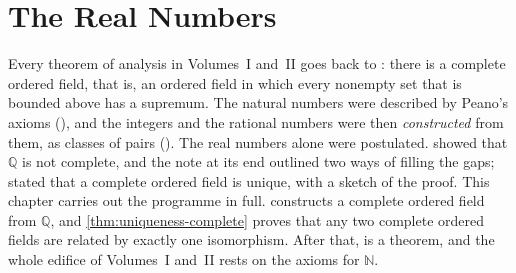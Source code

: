 \chapter{The Real Numbers}
\label{ch:real-numbers-construction}


Every theorem of analysis in Volumes~I and~II goes back to : there is a complete ordered field, that is, an ordered field in which every nonempty set that is bounded above has a supremum. The natural numbers were described by Peano's axioms (), and the integers and the rational numbers were then \emph{constructed} from them, as classes of pairs (). The real numbers alone were postulated.  showed that $\mathbb Q$ is not complete, and the note at its end outlined two ways of filling the gaps;  stated that a complete ordered field is unique, with a sketch of the proof. This chapter carries out the programme in full.  constructs a complete ordered field from $\mathbb Q$, and \cref{thm:uniqueness-complete} proves that any two complete ordered fields are related by exactly one isomorphism. After that,  is a theorem, and the whole edifice of Volumes~I and~II rests on the axioms for $\mathbb N$.

